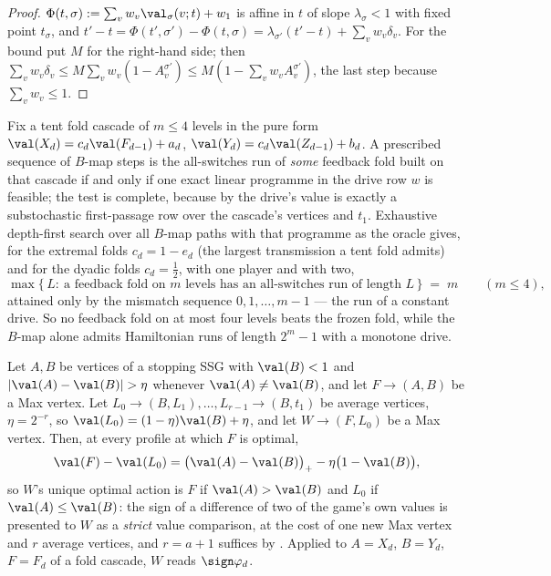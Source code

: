 \begin{proof}
$\Phi(t,\sigma):=\sum_vw_v\val_\sigma(v;t)+w_1$ is affine in $t$ of slope
$\lambda_\sigma<1$ with fixed point $t_\sigma$, and
$t'-t=\Phi(t',\sigma')-\Phi(t,\sigma)=\lambda_{\sigma'}(t'-t)+\sum_vw_v\delta_v$.
For the bound put $M$ for the right-hand side; then
$\sum_vw_v\delta_v\le M\sum_vw_v(1-A^{\sigma'}_v)\le M(1-\sum_vw_vA^{\sigma'}_v)$,
the last step because $\sum_vw_v\le1$.
\end{proof}

\begin{theorem}\label{thm:ff-exhaust}
Fix a tent fold cascade of $m\le4$ levels in the pure form
$\val(X_d)=c_d\val(F_{d-1})+a_d$, $\val(Y_d)=c_d\val(Z_{d-1})+b_d$. A prescribed
sequence of $B$-map steps is the all-switches run of \emph{some} feedback fold
built on that cascade if and only if one exact linear programme in the drive row
$w$ is feasible; the test is complete, because by  the
drive's value is exactly a substochastic first-passage row over the cascade's
vertices and $t_1$. Exhaustive depth-first search over all $B$-map paths with
that programme as the oracle gives, for the extremal folds
$c_d=1-e_d$ (the largest transmission a tent fold admits) and for the dyadic
folds $c_d=\tfrac12$, with one player and with two,
\[
  \max\{\,L:\ \text{a feedback fold on $m$ levels has an all-switches run of length }L\,\}
  \;=\;m \qquad (m\le4),
\]
attained only by the mismatch sequence $0,1,\dots,m-1$ --- the run of a constant
drive. So no feedback fold on at most four levels beats the frozen fold, while
the $B$-map alone admits Hamiltonian runs of length $2^{m}-1$ with a monotone
drive.
\end{theorem}

\begin{proposition}\label{prop:ff-sign}
Let $A,B$ be vertices of a stopping SSG with $\val(B)<1$ and
$|\val(A)-\val(B)|>\eta$ whenever $\val(A)\ne\val(B)$, and let $F\to(A,B)$ be a
Max vertex. Let $L_0\to(B,L_1),\dots,L_{r-1}\to(B,t_1)$ be average vertices,
$\eta=2^{-r}$, so $\val(L_0)=(1-\eta)\val(B)+\eta$, and let $W\to(F,L_0)$ be a
Max vertex. Then, at every profile at which $F$ is optimal,
\[
  \val(F)-\val(L_0)=\bigl(\val(A)-\val(B)\bigr)_+-\eta\bigl(1-\val(B)\bigr),
\]
so $W$'s unique optimal action is $F$ if $\val(A)>\val(B)$ and $L_0$ if
$\val(A)\le\val(B)$: the sign of a difference of two of the game's own values is
presented to $W$ as a \emph{strict} value comparison, at the cost of one new
Max vertex and $r$ average vertices, and $r=a+1$ suffices by
. Applied to $A=X_d$, $B=Y_d$, $F=F_d$ of a fold
cascade, $W$ reads $\sign\varphi_d$.
\end{proposition}

